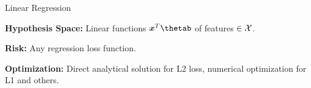 \documentclass[11pt,compress,t,notes=noshow, xcolor=table]{beamer}
\begin{document}
\begin{frame}{Linear Regression}
\lz

\textbf{Hypothesis Space:} Linear functions $\xv^T\thetab$ of features $\in \mathcal{X}$.\\

\lz

\textbf{Risk:} Any regression loss function.

\lz

\textbf{Optimization:} Direct analytical solution for L2 loss, numerical optimization for L1 and others.

\end{frame}

\endlecture
\end{document}

